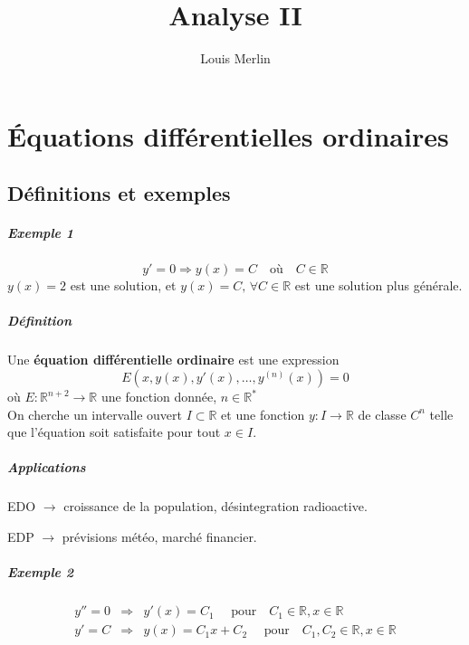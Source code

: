 \message{ !name(analyse-02.tex)}\documentclass[1Opt]{report}
\author{Louis Merlin}
\begin{document}


\title{Analyse II}
\maketitle

\tableofcontents


\chapter{Équations différentielles ordinaires}

\section{Définitions et exemples}


\paragraph{Exemple 1}
\[y'=0 \Rightarrow y(x)=C \quad \mbox{où} \quad C\in{\mathbb R}\]
$y(x)=2$ est une solution, et $y(x)=C,\,\forall C\in{\mathbb R}$ est une solution
plus générale.

\paragraph{Définition}
Une \textbf{équation différentielle ordinaire} est une expression
\[ E(x,y(x),y'(x),\ldots,y^{(n)}(x))=0\]
où $E:{\mathbb R}^{n+2}\rightarrow{\mathbb R}$ une fonction donnée,
$n\in{\mathbb R}^\ast$\\
On cherche un intervalle ouvert $I\subset{\mathbb R}$ et une fonction
$y:I\rightarrow{\mathbb R}$ de classe $C^n$ telle que l'équation soit satisfaite
pour tout $x\in I$.

\paragraph{Applications}
\begin{description}
  \item EDO $\rightarrow$ croissance de la population, désintegration radioactive.
  \item EDP $\rightarrow$ prévisions météo, marché financier.
\end{description}

\paragraph{Exemple 2}
\begin{eqnarray*}
   y''=0 & \Rightarrow & y'(x)=C_1\quad \mbox{ pour} \quad C_1\in{\mathbb R}, x\in{\mathbb R} \\
   y'=C & \Rightarrow & y(x)=C_1x+C_2\quad \mbox{ pour} \quad C_1,C_2\in{\mathbb R},x\in{\mathbb R}
\end{eqnarray*}
\end{document}
